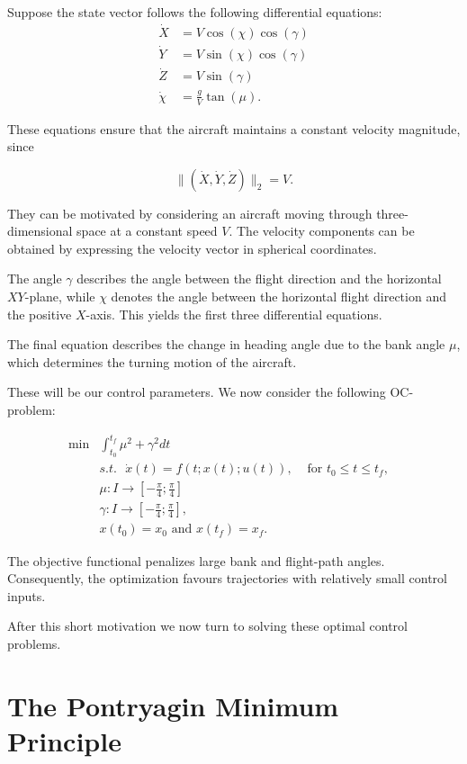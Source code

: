 \documentclass[a4paper]{article}
\theoremstyle{definitions}
\theoremstyle{bemerkung}
\theoremstyle{satz}
\theoremstyle{satz}
\begin{document}
Suppose the state vector follows the following differential equations:
\begin{align*}
    \dot{X} &= V \cos(\chi) \cos(\gamma) \\
    \dot{Y} &= V \sin(\chi) \cos(\gamma) \\
    \dot{Z} &= V \sin(\gamma) \\
    \dot{\chi} &= \frac{g}{V} \tan({\mu}).
\end{align*}

These equations ensure that the aircraft maintains a constant velocity magnitude, since

\[
    \|(\dot X,\dot Y,\dot Z)\|_2=V.
\]

They can be motivated by considering an aircraft moving through three-dimensional space at a constant speed \(V\). The velocity components can be obtained by expressing the velocity vector in spherical coordinates.

The angle \(\gamma\) describes the angle between the flight direction and the horizontal \(XY\)-plane, while \(\chi\) denotes the angle between the horizontal flight direction and the positive \(X\)-axis. This yields the first three differential equations.

The final equation describes the change in heading angle due to the bank angle \(\mu\), which determines the turning motion of the aircraft.

These will be our control parameters. We now consider the following OC-problem:

\begin{align*}
    \min &\int_{t_0}^{t_f}\mu^2 + \gamma^2 dt\\
        & s.t. \text{ } \dot{x}(t) = f(t;x(t);u(t)), & \text{ for } t_0\leq t \leq t_f,\\
        &  \mu: I \to [-\frac{\pi}{4}; \frac{\pi}{4}] &  & \\
        & \gamma: I\to [-\frac{\pi}{4}; \frac{\pi}{4}], &  & \\
        & x(t_0) = x_0 \text{ and } x(t_f) = x_f. & &
\end{align*}

The objective functional penalizes large bank and flight-path angles. Consequently, the optimization favours trajectories with relatively small control inputs.

After this short motivation we now turn to solving these optimal control problems.

\section{The Pontryagin Minimum Principle}
\end{document}
